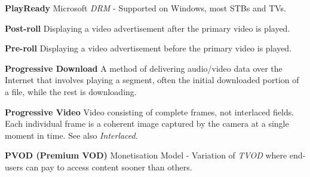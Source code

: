 \smallskip
\textbf{PlayReady}
Microsoft \textit{DRM} - Supported on Windows, most STBs and TVs.

\smallskip
\textbf{Post-roll}
Displaying a video advertisement after the primary video is played.

\smallskip
\textbf{Pre-roll}
Displaying a video advertisement before the primary video is played.

\smallskip
\textbf{Progressive Download}
A method of delivering audio/video data over the Internet that involves playing a segment, often the initial downloaded portion of a file, while the rest is downloading.

\smallskip
\textbf{Progressive Video}
Video consisting of complete frames, not interlaced fields. Each individual frame is a coherent image captured by the camera at a single moment in time. See also \textit{Interlaced}.

\smallskip
\textbf{PVOD (Premium VOD)}
Monetisation Model - Variation of \textit{TVOD} where end-users can pay to access content sooner than others.
